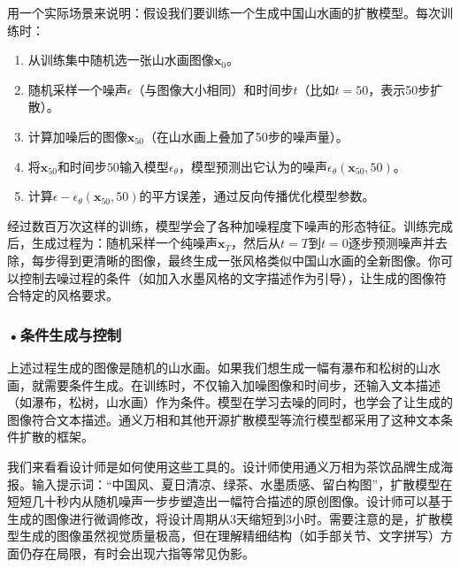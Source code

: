 用一个实际场景来说明：假设我们要训练一个生成中国山水画的扩散模型。每次训练时：
\begin{enumerate}
\item 从训练集中随机选一张山水画图像$\mathbf{x}_0$。
\item 随机采样一个噪声$\epsilon$（与图像大小相同）和时间步$t$（比如$t=50$，表示50步扩散）。
\item 计算加噪后的图像$\mathbf{x}_{50}$（在山水画上叠加了50步的噪声量）。
\item 将$\mathbf{x}_{50}$和时间步$50$输入模型$\epsilon_{\theta}$，模型预测出它认为的噪声$\epsilon_{\theta}(\mathbf{x}_{50}, 50)$。
\item 计算$\epsilon - \epsilon_{\theta}(\mathbf{x}_{50}, 50)$的平方误差，通过反向传播优化模型参数。
\end{enumerate}

经过数百万次这样的训练，模型学会了各种加噪程度下噪声的形态特征。训练完成后，生成过程为：随机采样一个纯噪声$\mathbf{x}_T$，然后从$t=T$到$t=0$逐步预测噪声并去除，每步得到更清晰的图像，最终生成一张风格类似中国山水画的全新图像。你可以控制去噪过程的条件（如加入水墨风格的文字描述作为引导），让生成的图像符合特定的风格要求。

\subsubsection*{\textbf{•条件生成与控制}}

上述过程生成的图像是随机的山水画。如果我们想生成一幅有瀑布和松树的山水画，就需要条件生成。在训练时，不仅输入加噪图像和时间步，还输入文本描述（如瀑布，松树，山水画）作为条件。模型在学习去噪的同时，也学会了让生成的图像符合文本描述。通义万相和其他开源扩散模型等流行模型都采用了这种文本条件扩散的框架。

我们来看看设计师是如何使用这些工具的。设计师使用通义万相为茶饮品牌生成海报。输入提示词：“中国风、夏日清凉、绿茶、水墨质感、留白构图”，扩散模型在短短几十秒内从随机噪声一步步塑造出一幅符合描述的原创图像。设计师可以基于生成的图像进行微调修改，将设计周期从3天缩短到3小时。需要注意的是，扩散模型生成的图像虽然视觉质量极高，但在理解精细结构（如手部关节、文字拼写）方面仍存在局限，有时会出现六指等常见伪影。

